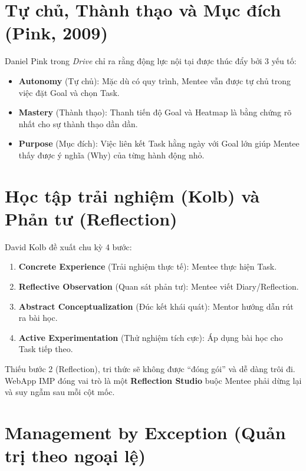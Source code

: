 \section{Tự chủ, Thành thạo và Mục đích (Pink, 2009)}

Daniel Pink trong \textit{Drive} \citep{pink2009} chỉ ra rằng động lực nội tại được thúc đẩy bởi 3 yếu tố:
\begin{itemize}
    \item \textbf{Autonomy} (Tự chủ): Mặc dù có quy trình, Mentee vẫn được tự chủ trong việc đặt Goal và chọn Task.
    \item \textbf{Mastery} (Thành thạo): Thanh tiến độ Goal và Heatmap là bằng chứng rõ nhất cho sự thành thạo dần dần.
    \item \textbf{Purpose} (Mục đích): Việc liên kết Task hằng ngày với Goal lớn giúp Mentee thấy được ý nghĩa (Why) của từng hành động nhỏ.
\end{itemize}

\section{Học tập trải nghiệm (Kolb) và Phản tư (Reflection)}

David Kolb \citep{kolb1984} đề xuất chu kỳ 4 bước:

\begin{enumerate}
  \item \textbf{Concrete Experience} (Trải nghiệm thực tế): Mentee thực hiện Task.
  \item \textbf{Reflective Observation} (Quan sát phản tư): Mentee viết Diary/Reflection.
  \item \textbf{Abstract Conceptualization} (Đúc kết khái quát): Mentor hướng dẫn rút ra bài học.
  \item \textbf{Active Experimentation} (Thử nghiệm tích cực): Áp dụng bài học cho Task tiếp theo.
\end{enumerate}

Thiếu bước 2 (Reflection), tri thức sẽ không được ``đóng gói'' và dễ dàng trôi đi. WebApp IMP đóng vai trò là một \textbf{Reflection Studio} buộc Mentee phải dừng lại và suy ngẫm sau mỗi cột mốc.

\section{Management by Exception (Quản trị theo ngoại lệ)}

